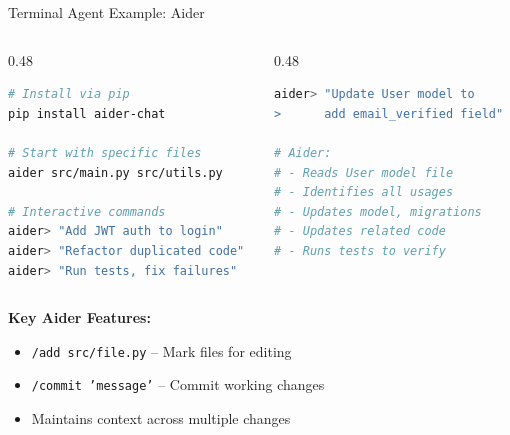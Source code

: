 \documentclass[aspectratio=169,11pt]{beamer}
\begin{document}
\begin{frame}[fragile]{Terminal Agent Example: Aider}
    \begin{columns}[T]
        \begin{column}{0.48\textwidth}
            \begin{lstlisting}[language=bash, title=Aider Setup]
# Install via pip
pip install aider-chat

# Start with specific files
aider src/main.py src/utils.py

# Interactive commands
aider> "Add JWT auth to login"
aider> "Refactor duplicated code"
aider> "Run tests, fix failures"
            \end{lstlisting}
        \end{column}
        \begin{column}{0.48\textwidth}
            \begin{lstlisting}[language=bash, title=Multi-File Refactoring]
aider> "Update User model to
>      add email_verified field"

# Aider:
# - Reads User model file
# - Identifies all usages
# - Updates model, migrations
# - Updates related code
# - Runs tests to verify
            \end{lstlisting}
        \end{column}
    \end{columns}

    \vspace{0.3cm}
    \textbf{Key Aider Features:}
    \begin{itemize}
        \item \texttt{/add src/file.py} -- Mark files for editing
        \item \texttt{/commit 'message'} -- Commit working changes
        \item Maintains context across multiple changes
    \end{itemize}

\end{frame}
\end{document}
